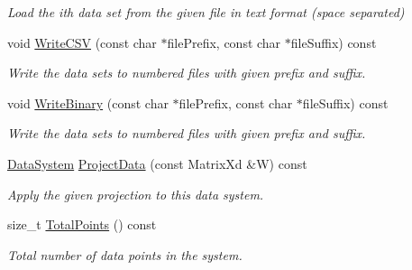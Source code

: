 \begin{DoxyCompactItemize}
\begin{DoxyCompactList}\small\item\em Load the ith data set from the given file in text format (space separated) \end{DoxyCompactList}\item 
\hypertarget{struct_d_r_d_s_p_1_1_data_system_a802b620b6709d221ccee3688cfd392f0}{void \hyperlink{struct_d_r_d_s_p_1_1_data_system_a802b620b6709d221ccee3688cfd392f0}{Write\-C\-S\-V} (const char $\ast$file\-Prefix, const char $\ast$file\-Suffix) const }\label{struct_d_r_d_s_p_1_1_data_system_a802b620b6709d221ccee3688cfd392f0}

\begin{DoxyCompactList}\small\item\em Write the data sets to numbered files with given prefix and suffix. \end{DoxyCompactList}\item 
\hypertarget{struct_d_r_d_s_p_1_1_data_system_a63962c2f3d3274bac0170991a551896c}{void \hyperlink{struct_d_r_d_s_p_1_1_data_system_a63962c2f3d3274bac0170991a551896c}{Write\-Binary} (const char $\ast$file\-Prefix, const char $\ast$file\-Suffix) const }\label{struct_d_r_d_s_p_1_1_data_system_a63962c2f3d3274bac0170991a551896c}

\begin{DoxyCompactList}\small\item\em Write the data sets to numbered files with given prefix and suffix. \end{DoxyCompactList}\item 
\hypertarget{struct_d_r_d_s_p_1_1_data_system_afd5e714d21c0d7c1b1efb65b233788ab}{\hyperlink{struct_d_r_d_s_p_1_1_data_system}{Data\-System} \hyperlink{struct_d_r_d_s_p_1_1_data_system_afd5e714d21c0d7c1b1efb65b233788ab}{Project\-Data} (const Matrix\-Xd \&W) const }\label{struct_d_r_d_s_p_1_1_data_system_afd5e714d21c0d7c1b1efb65b233788ab}

\begin{DoxyCompactList}\small\item\em Apply the given projection to this data system. \end{DoxyCompactList}\item 
\hypertarget{struct_d_r_d_s_p_1_1_data_system_a952b433226cdd312620db7140fe352ce}{size\-\_\-t \hyperlink{struct_d_r_d_s_p_1_1_data_system_a952b433226cdd312620db7140fe352ce}{Total\-Points} () const }\label{struct_d_r_d_s_p_1_1_data_system_a952b433226cdd312620db7140fe352ce}

\begin{DoxyCompactList}\small\item\em Total number of data points in the system. \end{DoxyCompactList}\end{DoxyCompactItemize}
